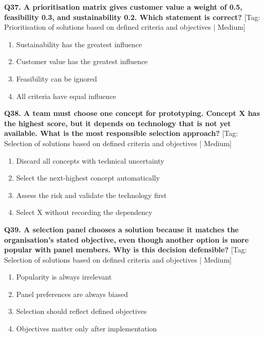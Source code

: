 \noindent\textbf{Q37. A prioritisation matrix gives customer value a weight of 0.5, feasibility 0.3, and sustainability 0.2. Which statement is correct?} \hfill [Tag: Prioritisation of solutions based on defined criteria and objectives | Medium]
\begin{enumerate}[label=(\alph*),topsep=2pt,itemsep=1pt,partopsep=0pt,parsep=0pt]
    \item {Sustainability has the greatest influence}
    \item {Customer value has the greatest influence}
    \item {Feasibility can be ignored}
    \item {All criteria have equal influence}
\end{enumerate}
\vspace{2mm}

\noindent\textbf{Q38. A team must choose one concept for prototyping. Concept X has the highest score, but it depends on technology that is not yet available. What is the most responsible selection approach?} \hfill [Tag: Selection of solutions based on defined criteria and objectives | Medium]
\begin{enumerate}[label=(\alph*),topsep=2pt,itemsep=1pt,partopsep=0pt,parsep=0pt]
    \item {Discard all concepts with technical uncertainty}
    \item {Select the next-highest concept automatically}
    \item {Assess the risk and validate the technology first}
    \item {Select X without recording the dependency}
\end{enumerate}
\vspace{2mm}

\noindent\textbf{Q39. A selection panel chooses a solution because it matches the organisation's stated objective, even though another option is more popular with panel members. Why is this decision defensible?} \hfill [Tag: Selection of solutions based on defined criteria and objectives | Medium]
\begin{enumerate}[label=(\alph*),topsep=2pt,itemsep=1pt,partopsep=0pt,parsep=0pt]
    \item {Popularity is always irrelevant}
    \item {Panel preferences are always biased}
    \item {Selection should reflect defined objectives}
    \item {Objectives matter only after implementation}
\end{enumerate}
\vspace{2mm}

